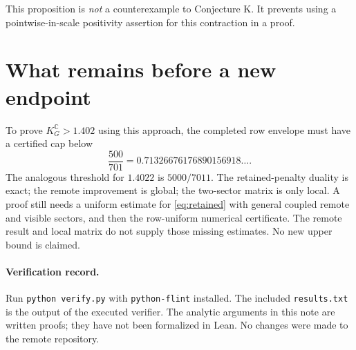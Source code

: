 \documentclass[11pt]{article}
\newcommand{\C}{\mathbb C}
\begin{document}
This proposition is \emph{not} a counterexample to Conjecture K. It prevents
using a pointwise-in-scale positivity assertion for this contraction in a proof.

\section{What remains before a new endpoint}
To prove $K_G^{\C}>1.402$ using this approach, the completed row envelope must
have a certified cap below
\[
 \frac{500}{701}=0.71326676176890156918\ldots.
\]
The analogous threshold for $1.4022$ is $5000/7011$.
The retained-penalty duality is exact; the remote improvement is global;
the two-sector matrix is only local. A proof still needs a uniform estimate
for \eqref{eq:retained} with general coupled remote and visible sectors, and
then the row-uniform numerical certificate. The remote result and local
matrix do not supply those missing estimates. No new upper bound is claimed.

\paragraph{Verification record.}
Run \texttt{python verify.py} with \texttt{python-flint} installed.
The included \texttt{results.txt} is the output of the executed verifier.
The analytic arguments in this note are written proofs; they have not been
formalized in Lean. No changes were made to the remote repository.
\end{document}
